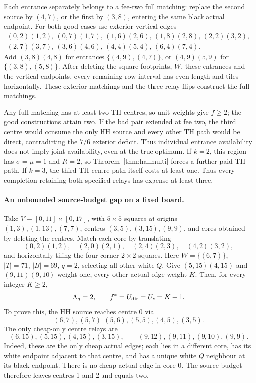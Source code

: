 \documentclass[11pt]{article}
\begin{document}
Each entrance separately belongs to a fee-two full matching: replace the
second source by $(4,7)$, or the first by $(3,8)$, entering the same
black actual endpoint. For both good cases use exterior vertical edges
\[
\begin{gathered}
 (0,2)(1,2),\ (0,7)(1,7),\ (1,6)(2,6),\ (1,8)(2,8),\ (2,2)(3,2),\\
 (2,7)(3,7),\ (3,6)(4,6),\ (4,4)(5,4),\ (6,4)(7,4).
\end{gathered}
\]
Add $(3,8)(4,8)$ for entrances $\{(4,9),(4,7)\}$, or
$(4,9)(5,9)$ for $\{(3,8),(5,8)\}$. After deleting the square footprints,
$W$, these entrances and the vertical endpoints, every remaining row
interval has even length and tiles horizontally. These exterior matchings
and the three relay flips construct the full matchings.

Any full matching has at least two TH centres, so unit weights give
$f\ge2$; the good constructions attain two. If the bad pair extended at
fee two, the third centre would consume the only HH source and every
other TH path would be direct, contradicting the $7/6$ exterior deficit.
Thus individual entrance availability does not imply joint availability,
even at the true optimum. If $k=2$, this region has $\sigma=\mu=1$
and $R=2$, so Theorem~\ref{thm:hallmulti} forces a further paid TH path.
If $k=3$, the third TH centre path itself costs at least one. Thus every
completion retaining both specified relays has expense at least three.

\paragraph{An unbounded source-budget gap on a fixed board.}
Take $V=[0,11]\times[0,17]$, with $5\times5$ squares at origins
$(1,3),(1,13),(7,7)$, centres $(3,5),(3,15),(9,9)$, and cores obtained
by deleting the centres. Match each core by translating
\[
 (0,2)(1,2),\quad(2,0)(2,1),\quad(2,4)(2,3),\quad(4,2)(3,2),
\]
and horizontally tiling the four corner $2\times2$ squares. Here
$W=\{(6,7)\}$, $|T|=71$, $|B|=69$, $q=2$, selecting all other white
$Q$. Give $(5,15)(4,15)$ and $(9,11)(9,10)$ weight one, every other
actual edge weight $K$. Then, for every integer $K\ge2$,
\begin{equation}\label{eq:portgap}
 \Lambda_q=2,\qquad f^*=U_{\rm dir}=U_c=K+1.
\end{equation}
To prove this, the HH source reaches centre 0 via
\[
 (6,7),(5,7),(5,6),(5,5),(4,5),(3,5).
\]
The only cheap-only centre relays are
\[
 (6,15),(5,15),(4,15),(3,15),\qquad
 (9,12),(9,11),(9,10),(9,9).
\]
Indeed, these are the only cheap actual edges; each lies in a different
core, has its white endpoint adjacent to that centre, and has a unique
white $Q$ neighbour at its black endpoint. There is no cheap actual edge
in core 0. The source budget therefore leaves centres 1 and 2 and equals two.
\end{document}
